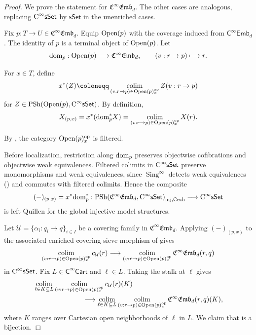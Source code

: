 \documentclass{amsart}
\newcommand{\cat}[1]{\mathsf{#1}}
\newcommand{\sset}{\cat{sSet}}
\newcommand{\dom}{\textnormal{dom}}
\DeclareMathOperator*{\colim}{colim}
\newcommand{\inj}{\textnormal{inj}}
\newcommand{\Cech}{\textnormal{\v{C}ech}}
\newcommand{\Open}{\textnormal{Open}}
\DeclareMathOperator{\Sing}{Sing}
\newcommand{\CsSet}{\textnormal{C}^{\infty}\sset}
\newcommand{\Cart}{\cat{C}^{\infty}\cat{Cart}}
\newcommand{\fembnoniso}[1]{\cat{C}^{\infty}\cat{Emb}_{#1}}
\newcommand{\femb}[1]{\mathfrak{C}^{\infty}\mathfrak{Emb}_{#1}}
\newcommand{\psh}{\mathrm{PSh}}
\renewcommand{\op}{\mathrm{op}}
\theoremstyle{definition}
\numberwithin{equation}{subsection}
\numberwithin{subsubsection}{subsection}
\begin{document}
\begin{proof}
  We prove the statement for \(\femb{d}\). The other cases are analogous,
  replacing \(\CsSet\) by \(\sset\) in the unenriched cases.

  Fix \(p:T\to U\in\femb{d}\). Equip \(\Open(p)\) with the coverage induced
  from \(\fembnoniso{d}\). The identity of \(p\) is a terminal object of
  \(\Open(p)\). Let
  \[
    \dom_p:\Open(p)\longrightarrow\femb{d},
    \qquad (v:r\to p)\longmapsto r.
  \]

  For \(x\in T\), define
  \[
    x^*(Z)\coloneqq
    \colim_{(v:r\to p)\in\Open(p)_x^{\op}}Z(v:r\to p)
  \]
  for \(Z\in\psh(\Open(p),\CsSet)\). By definition,
  \begin{equation}\label{eq:femb.fiberwise.stalk}
    X_{(p,x)}
    =x^*(\dom_p^*X)
    =\colim_{(v:r\to p)\in\Open(p)_x^{\op}}X(r).
  \end{equation}

  By , the category
  \(\Open(p)_x^{\op}\) is filtered.

  Before localization, restriction along \(\dom_p\) preserves
  objectwise cofibrations and objectwise weak equivalences. Filtered colimits in
  \(\CsSet\) preserve monomorphisms and weak equivalences, since
  \(\Sing^\infty\) detects weak equivalences
  () and commutes with filtered
  colimits. Hence the composite
  \[
    (-)_{(p,x)}=x^*\dom_p^*:
    \psh(\femb{d},\CsSet)_{\inj,\Cech}
    \longrightarrow
    \CsSet
  \]
  is left Quillen for the global injective model structures.

  Let \(\mathcal{U}=\{\alpha_i:q_i\to q\}_{i\in I}\) be a covering family in
  \(\femb{d}\). Applying \((- )_{(p,x)}\) to the associated enriched
  covering-sieve morphism of  gives
  \begin{equation}\label{eq:dom.restricted.covering.sieve.source.stalk}
    \colim_{(v:r\to p)\in\Open(p)_x^{\op}}c_{\mathcal{U}}(r)
    \longrightarrow
    \colim_{(v:r\to p)\in\Open(p)_x^{\op}}\femb{d}(r,q)
  \end{equation}
  in \(\CsSet\). Fix \(L\in\Cart\) and \(\ell\in L\). Taking the stalk at
  \(\ell\) gives
  \begin{equation}\label{eq:dom.restricted.covering.sieve.double.stalk}
    \begin{aligned}
      &\colim_{\ell\in K\subseteq L}
      \colim_{(v:r\to p)\in\Open(p)_x^{\op}}
      c_{\mathcal{U}}(r)(K)\\
      &\hspace{25mm}\longrightarrow
      \colim_{\ell\in K\subseteq L}
      \colim_{(v:r\to p)\in\Open(p)_x^{\op}}
      \femb{d}(r,q)(K),
    \end{aligned}
  \end{equation}
  where \(K\) ranges over Cartesian open neighborhoods of \(\ell\) in \(L\).
  We claim that  is a
  bijection.


\end{proof}
\end{document}
